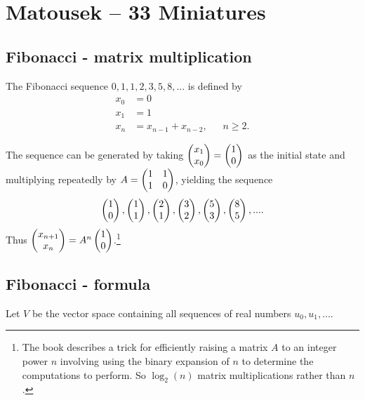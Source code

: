 \section{Matousek -- 33 Miniatures}

\subsection{Fibonacci - matrix multiplication}

\begin{definition*}
  The Fibonacci sequence $0, 1, 1, 2, 3, 5, 8, ...$ is defined by
  \begin{align*}
    x_0 &= 0\\
    x_1 &= 1\\
    x_{n} &= x_{n-1} + x_{n-2}, ~~~~~~~ n \geq 2.
  \end{align*}
\end{definition*}

\begin{remark*}
  The sequence can be generated by taking $\begin{pmatrix}x_1\\x_0\end{pmatrix} = \begin{pmatrix}1\\0\end{pmatrix}$ as the initial state and multiplying
  repeatedly by $A = \begin{pmatrix}1 & 1\\1 & 0\\ \end{pmatrix}$, yielding the sequence
  \begin{align*}
    \begin{pmatrix}1\\0\end{pmatrix}, \begin{pmatrix}1\\1\end{pmatrix}, \begin{pmatrix}2\\1\end{pmatrix}, \begin{pmatrix}3\\2\end{pmatrix}, \begin{pmatrix}5\\3\end{pmatrix}, \begin{pmatrix}8\\5\end{pmatrix}, ....
  \end{align*}
  Thus $\begin{pmatrix}x_{n+1}\\x_n\end{pmatrix} = A^n\begin{pmatrix}1\\0\end{pmatrix}$.\footnote{The book describes a trick for
    efficiently raising a matrix $A$ to an integer power $n$ involving using the binary expansion
    of $n$ to determine the computations to perform. So $\log_2(n)$ matrix multiplications rather
    than $n$.}
\end{remark*}

\newpage
\subsection{Fibonacci - formula}

Let $V$ be the vector space containing all sequences of real numbers
$u_0, u_1, \ldots$.

\begin{comment}
  \begin{proof}
    This is a vector space since:
    \begin{enumerate}
    \item It's an Abelian group under addition (the zero sequence is the additive identity, inverse
      is obtained by negating each element, addition is associative and commutative)
    \item Closed under scalar multiplication since $\lambda u_0, \lambda u_1, ... \in V$.
    \end{enumerate}
  \end{proof}
\end{comment}


